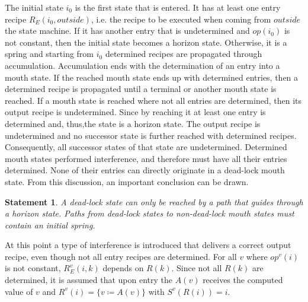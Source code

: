 \documentclass[12pt,a4paper]{scrartcl}
\newtheorem{statement}{Statement}
\begin{document}
The initial state $i_0$ is the first state that is entered. It has at least one
entry recipe $R_E(i_0,outside)$, i.e. the recipe to be executed when coming
from $outside$ the state machine. If it has another entry that is undetermined
and $op(i_0)$ is not constant, then the initial state becomes a horizon state.
Otherwise, it is a spring and starting from $i_0$ determined recipes are
propagated through accumulation.  Accumulation ends with the determination of
an entry into a mouth state. If the reached mouth state ends up with determined
entries, then a determined recipe is propagated until a terminal or another
mouth state is reached. If a mouth state is reached where not all entries are
determined, then its output recipe is undetermined. Since by reaching it at
least one entry is determined and, thus,the state is a horizon state. The
output recipe is undetermined and no successor state is further reached with
determined recipes. Consequently, all successor states of that state are
undetermined.  Determined mouth states performed interference, and therefore
must have all their entries determined.  None of their entries can directly
originate in a dead-lock mouth state. From this discussion, an important
conclusion can be drawn.  

\begin{statement} \label{stm:dead-lock-horizon}
A dead-lock state can only be reached by a path that guides through a horizon
state.  Paths from dead-lock states to non-dead-lock mouth states must contain
an initial spring.  
\end{statement}

At this point a type of interference is introduced that delivers a correct
output recipe, even though not all entry recipes are determined. For all $v$ where 
$op^v(i)$ is not constant, $R^v_E(i,k)$ depends on $R(k)$. Since not all 
$R(k)$ are determined, it is assumed that upon entry the $A(v)$ receives the
computed value of $v$ and $R^v(i) = \{ v \coloneqq  A(v) \}$ with $S^v(R(i))=i$.
\end{document}
